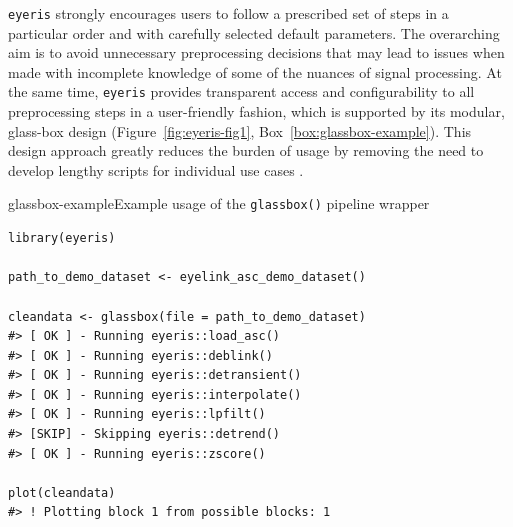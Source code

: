\texttt{eyeris} strongly encourages users to follow a prescribed set of steps in a particular order and with carefully selected default parameters. The overarching aim is to avoid unnecessary preprocessing decisions that may lead to issues when made with incomplete knowledge of some of the nuances of signal processing. At the same time, \texttt{eyeris} provides transparent access and configurability to all preprocessing steps in a user-friendly fashion, which is supported by its modular, glass-box design (Figure~\ref{fig:eyeris-fig1}, Box~\ref{box:glassbox-example}). This design approach greatly reduces the burden of usage by removing the need to develop lengthy scripts for individual use cases \parencite{varoquaux2016beyond}.

\begin{eyerisbox}{glassbox-example}{Example usage of the \texttt{glassbox()} pipeline wrapper}
\begin{lstlisting}
library(eyeris)

path_to_demo_dataset <- eyelink_asc_demo_dataset()

cleandata <- glassbox(file = path_to_demo_dataset)
#> [ OK ] - Running eyeris::load_asc()
#> [ OK ] - Running eyeris::deblink()
#> [ OK ] - Running eyeris::detransient()
#> [ OK ] - Running eyeris::interpolate()
#> [ OK ] - Running eyeris::lpfilt()
#> [SKIP] - Skipping eyeris::detrend()
#> [ OK ] - Running eyeris::zscore()

plot(cleandata)
#> ! Plotting block 1 from possible blocks: 1
\end{lstlisting}
\end{eyerisbox}

